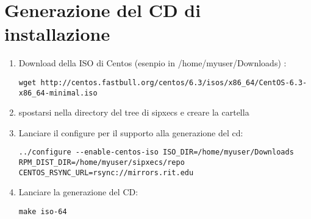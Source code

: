 \section{Generazione del CD di installazione}

\begin{enumerate}
\item Download della ISO di Centos (esenpio in /home/myuser/Downloads) : 
\begin{verbatim}
wget http://centos.fastbull.org/centos/6.3/isos/x86_64/CentOS-6.3-x86_64-minimal.iso
\end{verbatim}

\item spostarsi nella directory del tree di sipxecs e creare la cartella 

\item Lanciare il configure per il supporto alla generazione del cd: 
\begin{verbatim}
../configure --enable-centos-iso ISO_DIR=/home/myuser/Downloads RPM_DIST_DIR=/home/myuser/sipxecs/repo CENTOS_RSYNC_URL=rsync://mirrors.rit.edu
\end{verbatim}

\item Lanciare la generazione del CD: 
\begin{verbatim}
make iso-64
\end{verbatim}
\end{enumerate}